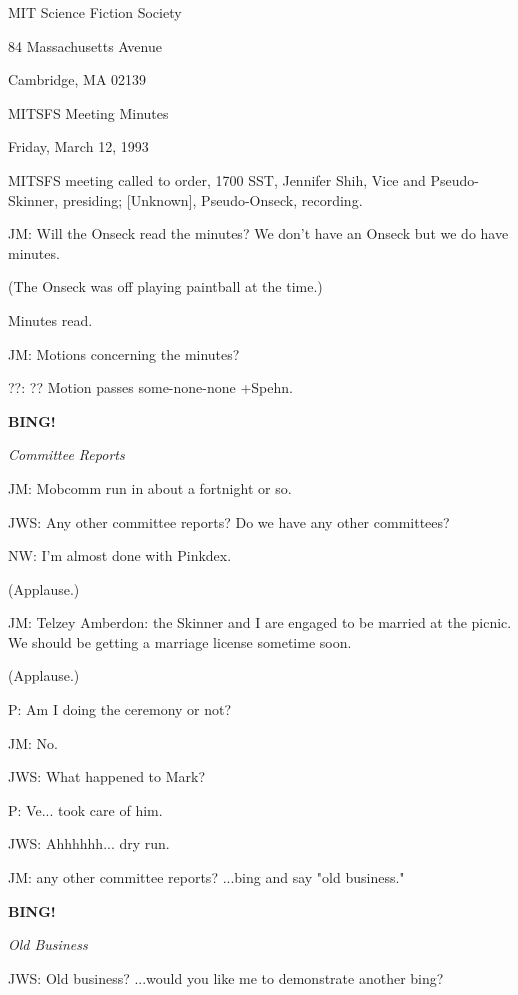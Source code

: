 \documentclass[12pt]{article}
\newcommand{\bing}{{\bf BING!} }
\newcommand{\goto}[1]{\bing \vskip 12pt \centerline{{\em{#1}}}}
\begin{document}
\begin{center}

MIT Science Fiction Society 

84 Massachusetts Avenue

Cambridge, MA 02139

\vspace{12pt}

MITSFS Meeting Minutes 

Friday, March 12, 1993

\end{center}
 
\vspace{18pt}

\setlength{\parskip}{6pt}

\noindent
MITSFS meeting called to order, 1700 SST,
Jennifer Shih, Vice and Pseudo-Skinner, presiding; [Unknown], Pseudo-Onseck, recording.

JM: Will the Onseck read the minutes? We don't have an Onseck but we do have minutes.

(The Onseck was off playing paintball at the time.)

Minutes read.

JM: Motions concerning the minutes?

??: ?? Motion passes some-none-none +Spehn.

\goto{Committee Reports}

JM: Mobcomm run in about a fortnight or so.

JWS: Any other committee reports? Do we have any other committees?

NW: I'm almost done with Pinkdex.

(Applause.)

JM: Telzey Amberdon: the Skinner and I are engaged to be married at the picnic. We should be getting a marriage license sometime soon.

(Applause.)

P: Am I doing the ceremony or not?

JM: No.

JWS: What happened to Mark?

P: Ve... took care of him.

JWS: Ahhhhhh... dry run.

JM: any other committee reports? ...bing and say "old business."

\goto{Old Business}

JWS: Old business? ...would you like me to demonstrate another bing?
\end{document}
